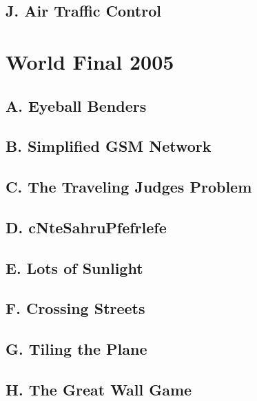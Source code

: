 \subsection{J. Air Traffic Control}
\raggedbottom
\hrulefill

\section{World Final 2005}
\subsection{A. Eyeball Benders}
\raggedbottom
\hrulefill
\subsection{B. Simplified GSM Network}
\raggedbottom
\hrulefill
\subsection{C. The Traveling Judges Problem}
\raggedbottom
\hrulefill
\subsection{D. cNteSahruPfefrlefe}
\raggedbottom
\hrulefill
\subsection{E. Lots of Sunlight}
\raggedbottom
\hrulefill
\subsection{F. Crossing Streets}
\raggedbottom
\hrulefill
\subsection{G. Tiling the Plane}
\raggedbottom
\hrulefill
\subsection{H. The Great Wall Game}
\raggedbottom
\hrulefill
